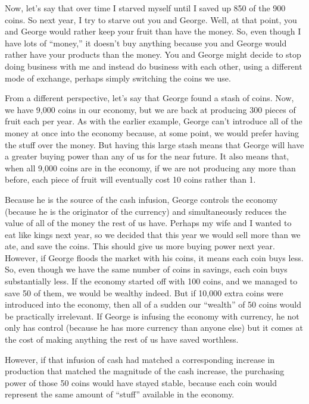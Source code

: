 Now, let’s say that over time I starved myself until I saved up 850 of
the 900 coins. So next year, I try to starve out you and George. Well,
at that point, you and George would rather keep your fruit than have
the money. So, even though I have lots of “money,” it doesn’t buy
anything because you and George would rather have your products than
the money. You and George might decide to stop doing business with me
and instead do business with each other, using a different mode of
exchange, perhaps simply switching the coins we use.


From a different perspective, let’s say that George found a stash of
coins. Now, we have 9,000 coins in our economy, but we are back at
producing 300 pieces of fruit each per year. As with the earlier
example, George can’t introduce all of the money at once into the
economy because, at some point, we would prefer having the stuff over
the money. But having this large stash means that George will have a
greater buying power than any of us for the near future. It also means
that, when all 9,000 coins are in the economy, if we are not producing
any more than before, each piece of fruit will eventually cost 10 coins
rather than 1. 


Because he is the source of the cash infusion, George controls the
economy (because he is the originator of the currency) and
simultaneously reduces the value of all of the money the rest of us
have. Perhaps my wife and I wanted to eat like kings next year, so we
decided that this year we would sell more than we ate, and save the
coins. This should give us more buying power next year. However, if
George floods the market with his coins, it means each coin buys less.
So, even though we have the same number of coins in savings, each coin
buys substantially less. If the economy started off with 100 coins, and
we managed to save 50 of them, we would be wealthy indeed. But if
10,000 extra coins were introduced into the economy, then all of a
sudden our “wealth” of 50 coins would be practically irrelevant. If
George is infusing the economy with currency, he not only has control
(because he has more currency than anyone else) but it comes at the
cost of making anything the rest of us have saved worthless. 


However, if that infusion of cash had matched a corresponding increase
in production that matched the magnitude of the cash increase, the
purchasing power of those 50 coins would have stayed stable, because
each coin would represent the same amount of “stuff” available in the
economy.


